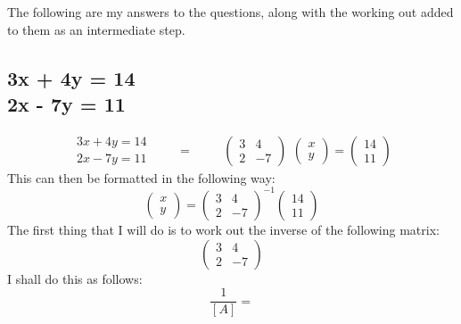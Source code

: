 \documentclass[a4paper,10pt]{article}
\begin{document}
      The following are my answers to the questions, along with the working out added to them as an intermediate step.

      \subsection{3x + 4y = 14\\2x - 7y = 11}
      \[
        \begin{split}
          3x + 4y = 14\\2x - 7y = 11
        \end{split}
        \qquad
        =
        \qquad
        \begin{split}
          \begin{pmatrix}
            3 &  4\\2 & -7
          \end{pmatrix}
        \end{split}
        \begin{pmatrix}
          x\\y
        \end{pmatrix}
        =
        \begin{pmatrix}
          14\\11
        \end{pmatrix}
      \]
      This can then be formatted in the following way:
      \begin{equation*}
        \begin{pmatrix}
          x\\y
        \end{pmatrix}
        =
        \begin{pmatrix}
          3 & 4\\2 & -7
        \end{pmatrix}
        ^{-1}
        \begin{pmatrix}
          14\\11
        \end{pmatrix}
      \end{equation*}
	    The first thing that I will do is to work out the inverse of the following matrix:
      \begin{equation*}
	       \begin{pmatrix}
           3 &  4\\
           2 & -7
	       \end{pmatrix}
      \end{equation*}
      I shall do this as follows:
      \begin{equation*}
        \frac{1}{[A]}
        =
      \end{equation*}
\end{document}

